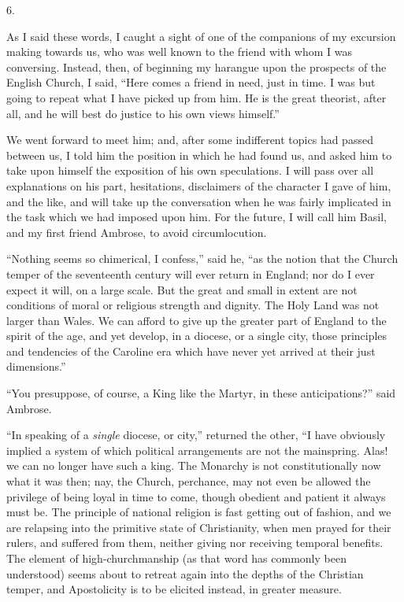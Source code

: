 6.

As I said these words, I caught a sight of one of
the companions of my excursion making towards us, who was well known
to the friend with whom I was conversing. Instead, then, of beginning
my harangue upon the prospects of the English Church, I said, ``Here
comes a friend in need, just in time. I was but going to repeat what I
have picked up from him. He is the great theorist, after all, and he
will best do justice to his own views himself.''

We went forward to meet him; and, after some
indifferent topics had passed between us, I told him the position in
which he had found us, and asked him to take upon himself the
exposition of his own speculations. I will pass over all explanations
on his part, hesitations, disclaimers of the character I gave of him,
and the like, and will take up the conversation when he was fairly
implicated in the task which we had imposed upon him. For the future,
I will call him Basil, and my first friend Ambrose, to avoid
circumlocution.

``Nothing seems so chimerical, I confess,'' said
he, ``as the notion that the Church temper of the seventeenth century
will ever return in England; nor do I ever expect it will, on a large
scale. But the great and small in extent are not conditions of moral
or religious strength and dignity. The Holy Land was not larger
than Wales. We can afford to give up the greater part of England to
the spirit of the age, and yet develop, in a diocese, or a single
city, those principles and tendencies of the Caroline era which have
never yet arrived at their just dimensions.''

``You presuppose, of course, a King like the
Martyr, in these anticipations?'' said Ambrose.

``In speaking of a \emph{single} diocese, or city,''
returned the other, ``I have obviously implied a system of which
political arrangements are not the mainspring. Alas! we can no longer
have such a king. The Monarchy is not constitutionally now what it was
then; nay, the Church, perchance, may not even be allowed the
privilege of being loyal in time to come, though obedient and patient
it always must be. The principle of national religion is fast getting
out of fashion, and we are relapsing into the primitive state of
Christianity, when men prayed for their rulers, and suffered from
them, neither giving nor receiving temporal benefits. The element of
high-churchmanship (as that word has commonly been understood) seems
about to retreat again into the depths of the Christian temper, and
Apostolicity is to be elicited instead, in greater measure.

